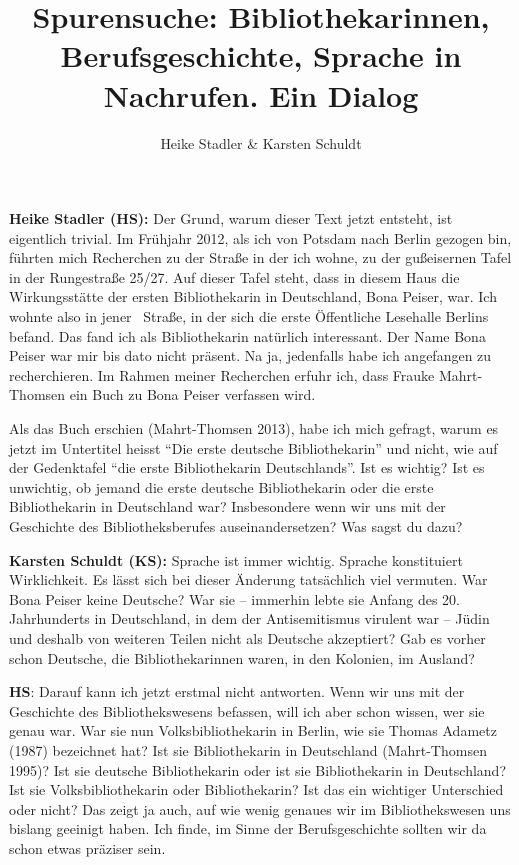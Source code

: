 \documentclass[a4paper,
fontsize=11pt,
oneside,
numbers=noperiodatend,
parskip=half-,
bibliography=totoc,
final
]{scrartcl}
\title{\LARGE{Spurensuche: Bibliothekarinnen, Berufsgeschichte, Sprache in Nachrufen. Ein Dialog}} %
\author{Heike Stadler \& Karsten Schuldt} %
\date{}
\begin{document}
\maketitle
\thispagestyle{fancyplain} 


\textbf{Heike Stadler (HS):} Der Grund, warum dieser Text jetzt
entsteht, ist eigentlich trivial. Im Frühjahr 2012, als ich von Potsdam
nach Berlin gezogen bin, führten mich Recherchen zu der Straße in der
ich wohne, zu der gußeisernen Tafel in der Rungestraße 25/27. Auf dieser
Tafel steht, dass in diesem Haus die Wirkungsstätte der ersten
Bibliothekarin in Deutschland, Bona Peiser, war. Ich wohnte also in
jener~ Straße, in der sich die erste Öffentliche Lesehalle Berlins
befand. Das fand ich als Bibliothekarin natürlich interessant. Der Name
Bona Peiser war mir bis dato nicht präsent. Na ja, jedenfalls habe ich
angefangen zu recherchieren. Im Rahmen meiner Recherchen erfuhr ich,
dass Frauke Mahrt-Thomsen ein Buch zu Bona Peiser verfassen wird.

Als das Buch erschien (Mahrt-Thomsen 2013), habe ich mich gefragt, warum
es jetzt im Untertitel heisst \enquote{Die erste deutsche
Bibliothekarin} und nicht, wie auf der Gedenktafel \enquote{die erste
Bibliothekarin Deutschlands}. Ist es wichtig? Ist es unwichtig, ob
jemand die erste deutsche Bibliothekarin oder die erste Bibliothekarin
in Deutschland war? Insbesondere wenn wir uns mit der Geschichte des
Bibliotheksberufes auseinandersetzen? Was sagst du dazu?

\textbf{Karsten Schuldt (KS):} Sprache ist immer wichtig. Sprache
konstituiert Wirklichkeit. Es lässt sich bei dieser Änderung tatsächlich
viel vermuten. War Bona Peiser keine Deutsche? War sie -- immerhin lebte
sie Anfang des 20. Jahrhunderts in Deutschland, in dem der
Antisemitismus virulent war -- Jüdin und deshalb von weiteren Teilen
nicht als Deutsche akzeptiert? Gab es vorher schon Deutsche, die
Bibliothekarinnen waren, in den Kolonien, im Ausland?

\textbf{HS}: Darauf kann ich jetzt erstmal nicht antworten. Wenn wir uns
mit der Geschichte des Bibliothekswesens befassen, will ich aber schon
wissen, wer sie genau war. War sie nun Volksbibliothekarin in Berlin,
wie sie Thomas Adametz (1987) bezeichnet hat? Ist sie Bibliothekarin in
Deutschland (Mahrt-Thomsen 1995)? Ist sie deutsche Bibliothekarin oder
ist sie Bibliothekarin in Deutschland? Ist sie Volksbibliothekarin oder
Bibliothekarin? Ist das ein wichtiger Unterschied oder nicht? Das zeigt
ja auch, auf wie wenig genaues wir im Bibliothekswesen uns bislang
geeinigt haben. Ich finde, im Sinne der Berufsgeschichte sollten wir da
schon etwas präziser sein.
\end{document}
